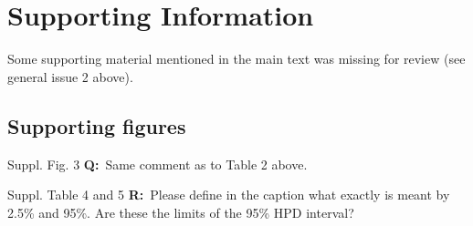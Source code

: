 \documentclass[11pt]{article}
\newenvironment{my_description}
{\begin{description}
  \setlength{\itemsep}{2pt}
  \setlength{\parskip}{0pt}
  \setlength{\parsep}{0pt}}
{\end{description}}
\newcommand{\Q}{\textbf{Q:}\ }
\newcommand{\R}{\textbf{R:}\ }
\begin{document}
\section{Supporting Information}
Some supporting material mentioned in the main text was missing for review (see general issue 2 above).
\subsection{Supporting figures}

\begin{my_description}
	\item[Suppl. Fig. 3]  \Q Same comment as to Table 2 above.
	\item[Suppl. Table 4 and 5] \R Please define in the caption what exactly is meant by 2.5\% and 95\%. Are these the limits of the 95\% HPD interval?
\end{my_description}



\end{document}
